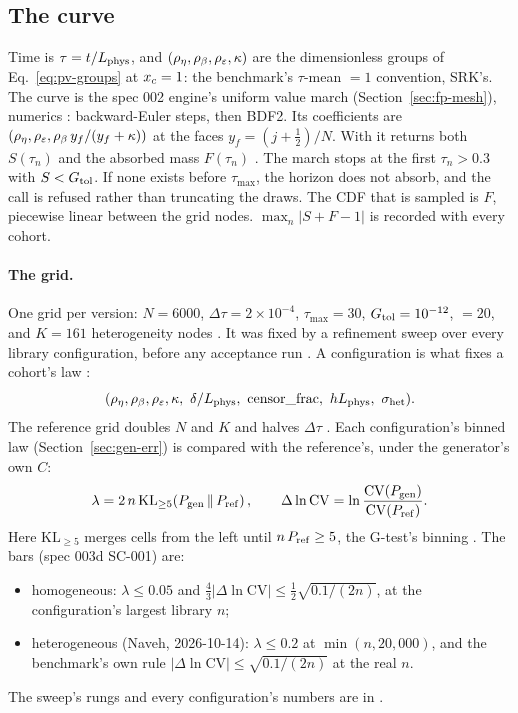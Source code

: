 \subsection{The curve}\label{sec:gen-curve}

Time is $\tau=t/L_{\rm phys}$, and $(\rho_\eta,\rho_\beta,\rho_\varepsilon,\kappa)$ are the dimensionless groups of
Eq.~\eqref{eq:pv-groups} at $x_c=1$: the benchmark's $\tau$-mean $=1$ convention, SRK's. The curve is the spec 002
engine's uniform value march (Section~\ref{sec:fp-mesh}), numerics :  backward-Euler steps,
then BDF2. Its coefficients are $(\rho_\eta,\rho_\varepsilon,\rho_\beta\,y_f/(y_f+\kappa))$ at the faces $y_f=(j+\frac12)/N$.
With  it returns both $S(\tau_n)$ and the absorbed mass $F(\tau_n)$
. The march stops at the first $\tau_n>0.3$ with $S<G_{\rm tol}$. If none
exists before $\tau_{\max}$, the horizon does not absorb, and the call is refused rather than truncating the draws.
The CDF that is sampled is $F$, piecewise linear between the grid nodes. $\max_n|S+F-1|$ is recorded with every
cohort.

\paragraph{The grid.} One grid per version: $N=6000$, $\Delta\tau=2\times10^{-4}$, $\tau_{\max}=30$,
$G_{\rm tol}=10^{-12}$,  $=20$, and $K=161$ heterogeneity nodes . It was fixed
by a refinement sweep over every library configuration, before any acceptance run
. A configuration is what fixes a cohort's law
:
\begin{equation}
  (\rho_\eta,\rho_\beta,\rho_\eps,\kappa,\ \delta/L_{\rm phys},\ \text{censor\_frac},\ h L_{\rm phys},\
  \sigma_{\rm het}).
\end{equation}
The reference grid doubles $N$ and $K$ and halves $\Delta\tau$ . Each
configuration's binned law (Section~\ref{sec:gen-err}) is compared with the reference's, under the generator's own
$C$:
\begin{equation}
  \lambda=2\,n\,\mathrm{KL}_{\ge5}\!\left(P_{\rm gen}\,\Vert\,P_{\rm ref}\right),\qquad
  \Delta\ln\mathrm{CV}=\ln\frac{\mathrm{CV}(P_{\rm gen})}{\mathrm{CV}(P_{\rm ref})}.
\end{equation}
Here $\mathrm{KL}_{\ge5}$ merges cells from the left until $n\,P_{\rm ref}\ge5$, the G-test's binning
\src{generator.py:kl_binned}. The bars (spec 003d SC-001) are:
\begin{itemize}[nosep]
  \item homogeneous: $\lambda\le0.05$ and $\tfrac43|\Delta\ln\mathrm{CV}|\le\tfrac12\sqrt{0.1/(2n)}$, at the
    configuration's largest library $n$;
  \item heterogeneous (Naveh, 2026-10-14): $\lambda\le0.2$ at $\min(n,20{,}000)$, and the benchmark's own rule
    $|\Delta\ln\mathrm{CV}|\le\sqrt{0.1/(2n)}$ at the real $n$.
\end{itemize}
The sweep's rungs and every configuration's numbers are in .

